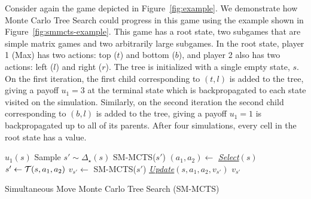 Consider again the game depicted in Figure~\ref{fig:example}. We demonstrate how Monte Carlo Tree Search
could progress in this game using the example shown in Figure~\ref{fig:smmcts-example}. This game has a root state,
two subgames that are simple matrix games and two arbitrarily large subgames. In the root state, player 1 (Max) has two
actions: top ($t$) and bottom ($b$), and player 2 also has two actions: left ($l$) and right ($r$). The tree is initialized
with a single empty state, $s$. On the first iteration, the first child corresponding to $(t,l)$ is added to the tree,
giving a payoff $u_1 = 3$ at the terminal state which is backpropagated to each state visited on the simulation.
Similarly, on the second iteration the second child corresponding to $(b,l)$ is added to the tree, giving a payoff $u_1 = 1$ is
backpropagated up to all of its parents.
After four simulations, every cell in the root state has a value.

\begin{algorithm2e}[t]
\small
{}
 {
	\Return $u_1(s)$\;
}
 {
        Sample $s' \sim \Delta_\star(s)$\;
	\Return SM-MCTS($s'$)\;
}
 {
	$(a_1, a_2) \leftarrow$ \emph{\underline{Select}}$(s)$\;\label{alg:smmcts:select}
	$s' \leftarrow \mathcal{T}(s,a_1,a_2)$\;
	$v_{s'} \leftarrow $ SM-MCTS($s'$)\;\label{alg:smmcts:reccall}
	\emph{\underline{Update}}$(s,a_1,a_2,v_{s'})$\;\label{alg:smmcts:up}
	\Return $v_{s'}$\;
}
\caption{Simultaneous Move Monte Carlo Tree Search (SM-MCTS)}\label{alg:smmcts}
\end{algorithm2e}

